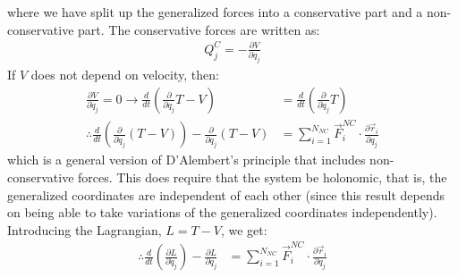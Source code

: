 where we have split up the generalized forces into a conservative part and a non-conservative part. The conservative forces are written as:
\begin{align}
Q_j^C=-\frac{\partial V}{\partial q_j}
\label{eqn:ConsGen}
\end{align}
If $V$ does not depend on velocity, then:
\begin{align}
\frac{\partial V}{\partial \dot{q}_j}=0 \to \frac{d}{dt}\left(\frac{\partial }{\partial \dot{q}_j} T-V \right) &=\frac{d}{dt}\left(\frac{\partial }{\partial \dot{q}_j} T \right)\nonumber\\
\therefore \frac{d}{dt}\left(\frac{\partial }{\partial \dot{q}_j} (T-V) \right) - \frac{\partial }{\partial q_j}(T-V)&=\sum_{i=1}^{N_{NC}}\vec{F}_i^{NC}\cdot\frac{\partial\vec{r}_i}{\partial q_j}
\end{align} 
which is a general version of D'Alembert's principle that includes non-conservative forces. This does require that the system be holonomic, that is, the generalized coordinates are independent of each other (since this result depends on being able to take variations of the generalized coordinates independently). Introducing the Lagrangian, $L=T-V$, we get:
\begin{align}
\therefore \frac{d}{dt}\left(\frac{\partial L}{\partial \dot{q}_j} \right) - \frac{\partial L}{\partial q_j}&=\sum_{i=1}^{N_{NC}}\vec{F}_i^{NC}\cdot\frac{\partial\vec{r}_i}{\partial q_j}
\end{align} 


